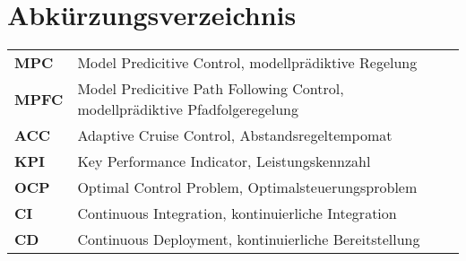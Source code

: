
\begingroup 
\let\clearpage\relax
\let\cleardoublepage\relax
\let\cleardoublepage\relax

\chapter*{Abkürzungsverzeichnis}
\thispagestyle{empty}
\vspace{-.5em} %
\begin{tabular}{@{} p{\figurelabelwidth} @{} p{\textwidth-\figurelabelwidth}}
\textbf{MPC} & Model Predicitive Control, modellprädiktive Regelung\\
\textbf{MPFC} & Model Predicitive Path Following Control, modellprädiktive Pfadfolgeregelung\\
\textbf{ACC} & Adaptive Cruise Control, Abstandsregeltempomat\\
\textbf{KPI} & Key Performance Indicator, Leistungskennzahl\\
\textbf{OCP} & Optimal Control Problem, Optimalsteuerungsproblem \\
\textbf{CI} & Continuous Integration, kontinuierliche Integration\\
\textbf{CD} & Continuous Deployment, kontinuierliche Bereitstellung\\
\end{tabular}                
\endgroup
\cleardoublepage